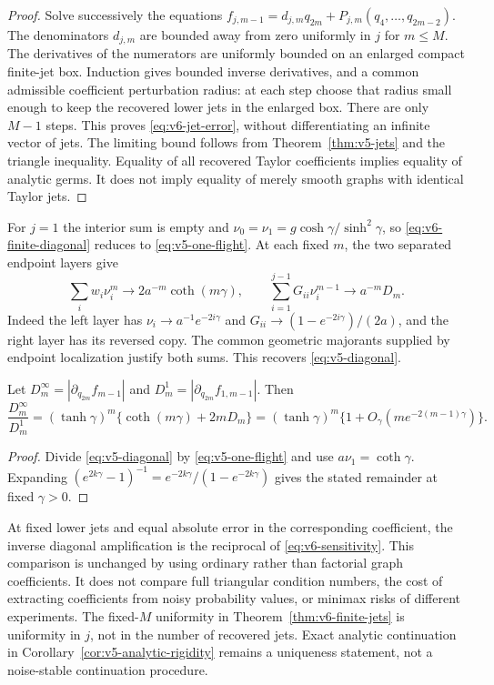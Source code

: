 \begin{proof}
Solve successively the equations
$f_{j,m-1}=d_{j,m}q_{2m}+P_{j,m}(q_4,\ldots,q_{2m-2})$.
The denominators $d_{j,m}$ are bounded away from zero uniformly in $j$
for $m\le M$. The derivatives of the numerators are uniformly bounded
on an enlarged compact finite-jet box. Induction gives bounded inverse
derivatives, and a common admissible coefficient perturbation radius:
at each step choose that radius small enough to keep the recovered
lower jets in the enlarged box. There are only $M-1$ steps. This proves
\eqref{eq:v6-jet-error}, without differentiating an infinite vector of
jets. The limiting bound follows from Theorem~\ref{thm:v5-jets} and
the triangle inequality. Equality of all recovered Taylor coefficients
implies equality of analytic germs. It does not imply equality of
merely smooth graphs with identical Taylor jets.
\end{proof}

For $j=1$ the interior sum is empty and
$\nu_0=\nu_1=g\cosh\gamma/\sinh^2\gamma$, so
\eqref{eq:v6-finite-diagonal} reduces to \eqref{eq:v5-one-flight}.
At each fixed $m$, the two separated endpoint layers give
\[
 \sum_iw_i\nu_i^m\longrightarrow 2a^{-m}\coth(m\gamma),\qquad
 \sum_{i=1}^{j-1}G_{ii}\nu_i^{m-1}\longrightarrow a^{-m}D_m.
\]
Indeed the left layer has $\nu_i\to a^{-1}e^{-2i\gamma}$ and
$G_{ii}\to(1-e^{-2i\gamma})/(2a)$, and the right layer has its
reversed copy. The common geometric majorants supplied by endpoint
localization justify both sums. This recovers \eqref{eq:v5-diagonal}.

\begin{proposition}
\label{prop:v6-sensitivity}
Let $D_m^\infty=|\partial_{q_{2m}}f_{m-1}|$ and
$D_m^1=|\partial_{q_{2m}}f_{1,m-1}|$. Then
\begin{equation}\label{eq:v6-sensitivity}
 \frac{D_m^\infty}{D_m^1}
  =(\tanh\gamma)^m\{\coth(m\gamma)+2mD_m\}
  =(\tanh\gamma)^m
       \{1+O_\gamma(m e^{-2(m-1)\gamma})\}.
\end{equation}
\end{proposition}
\begin{proof}
Divide \eqref{eq:v5-diagonal} by \eqref{eq:v5-one-flight} and use
$a\nu_1=\coth\gamma$. Expanding
$(e^{2k\gamma}-1)^{-1}=e^{-2k\gamma}/(1-e^{-2k\gamma})$
gives the stated remainder at fixed $\gamma>0$.
\end{proof}

At fixed lower jets and equal absolute error in the corresponding
coefficient, the inverse diagonal amplification is the reciprocal of
\eqref{eq:v6-sensitivity}. This comparison is unchanged by using ordinary
rather than factorial graph coefficients. It does not compare full
triangular condition numbers, the cost of extracting coefficients from
noisy probability values, or minimax risks of different experiments.
The fixed-$M$ uniformity in Theorem~\ref{thm:v6-finite-jets} is uniformity
in $j$, not in the number of recovered jets. Exact analytic continuation
in Corollary~\ref{cor:v5-analytic-rigidity} remains a uniqueness statement,
not a noise-stable continuation procedure.

